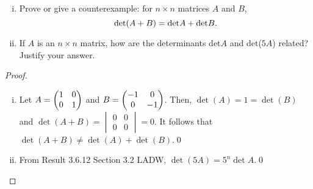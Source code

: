\begin{question}
	\normalfont
	
\begin{enumerate}[(i)]

\item Prove or give a counterexample: for $n \times n$ matrices $A$ and $B$, 
\[
\textup{det}(A + B) = \textup{det} A + \textup{det} B.
\]	


\item If $A$ is an $n \times n$ matrix, how are the determinants det$A$ and det($5A$) related? Justify your answer.
 
 \end{enumerate}
 
\end{question}

\begin{proof}
    \renewcommand{\qedsymbol}{$\blacksquare$}
    \begin{enumerate}[(i)]
        \item Let $A=\begin{pmatrix} 1 &0\\ 0 &1 \end{pmatrix}$ and $B=\begin{pmatrix} -1 &0\\ 0 &-1 \end{pmatrix}$.
        Then, $\det(A)=1=\det(B)$ and $\det(A+B)=\begin{vmatrix}
            0 & 0\\
            0 & 0
        \end{vmatrix}=0$.
        It follows that $\det(A+B)\not=\det(A)+\det(B)$.\qed
        \item From Result 3.6.12 Section 3.2 LADW, $\det(5A)=5^n\det A$.\qed
    \end{enumerate}
    \renewcommand{\qedsymbol}{}
\end{proof}